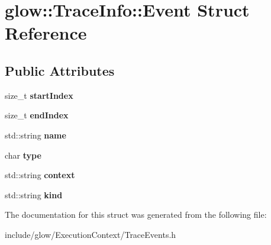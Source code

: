 \hypertarget{structglow_1_1_trace_info_1_1_event}{}\section{glow\+:\+:Trace\+Info\+:\+:Event Struct Reference}
\label{structglow_1_1_trace_info_1_1_event}
\subsection*{Public Attributes}
\begin{DoxyCompactItemize}
\item 
\mbox{\label{structglow_1_1_trace_info_1_1_event_a8eabf94e6484e72dbaf9a9bc1e9e4d45}} 
size\+\_\+t {\bfseries start\+Index}
\item 
\mbox{\label{structglow_1_1_trace_info_1_1_event_a0b1460faa316cf4e196cff630eacb4dd}} 
size\+\_\+t {\bfseries end\+Index}
\item 
\mbox{\label{structglow_1_1_trace_info_1_1_event_a817db0316c27da15382e5aafadb8bcd9}} 
std\+::string {\bfseries name}
\item 
\mbox{\label{structglow_1_1_trace_info_1_1_event_a6d21ca62d2a8f458b6c69a80737d99a0}} 
char {\bfseries type}
\item 
\mbox{\label{structglow_1_1_trace_info_1_1_event_addc09efe947ea7d108a81ab5e9ac7bff}} 
std\+::string {\bfseries context}
\item 
\mbox{\label{structglow_1_1_trace_info_1_1_event_ae1b00fd412a548601ee1c4c2e7a51de8}} 
std\+::string {\bfseries kind}
\end{DoxyCompactItemize}


The documentation for this struct was generated from the following file\+:\begin{DoxyCompactItemize}
\item 
include/glow/\+Execution\+Context/Trace\+Events.\+h\end{DoxyCompactItemize}
